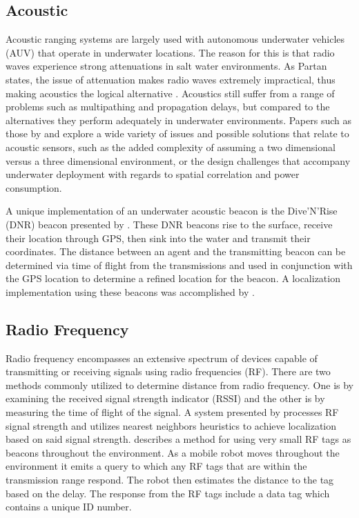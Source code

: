\documentclass[conference]{IEEEtran}
\begin{document}
		\subsection{Acoustic}
	
			Acoustic ranging systems are largely used with autonomous underwater vehicles (AUV) that operate in underwater locations. The reason for this is that radio waves experience strong attenuations in salt water environments. As Partan states, the issue of attenuation makes radio waves extremely impractical, thus making acoustics the logical alternative \cite{Partan2007}. Acoustics still suffer from a range of problems such as multipathing and propagation delays, but compared to the alternatives they perform adequately in underwater environments. Papers such as those by \cite{Erol-Kantarci2011} and \cite{Akyildiz2005} explore a wide variety of issues and possible solutions that relate to acoustic sensors, such as the added complexity of assuming a two dimensional versus a three dimensional environment, or the design challenges that accompany underwater deployment with regards to spatial correlation and power consumption. 
		  	
		  	
			A unique implementation of an underwater acoustic beacon is the Dive'N'Rise (DNR) beacon presented by \cite{Erol2007}. These DNR beacons rise to the surface, receive their location through GPS, then sink into the water and transmit their coordinates. The distance between an agent and the transmitting beacon can be determined via time of flight from the transmissions and used in conjunction with the GPS location to determine a refined location for the beacon. A localization implementation using these beacons was accomplished by \cite{Erol2008}. 
	

		\subsection{Radio Frequency}
			
			Radio frequency encompasses an extensive spectrum of devices capable of transmitting or receiving signals using radio frequencies (RF). There are two methods commonly utilized to determine distance from radio frequency. One is by examining the received signal strength indicator (RSSI) and the other is by measuring the time of flight of the signal. A system presented by \cite{Padmanabhan2000} processes RF signal strength and utilizes nearest neighbors heuristics to achieve localization based on said signal strength.  \cite{Kurth2003a} describes a method for using very small RF tags as beacons throughout the environment.  As a mobile robot moves throughout the environment it emits a query to which any RF tags that are within the transmission range respond. The robot then estimates the distance to the tag based on the delay. The response from the RF tags include a data tag which contains a unique ID number. 
						
\end{document}

